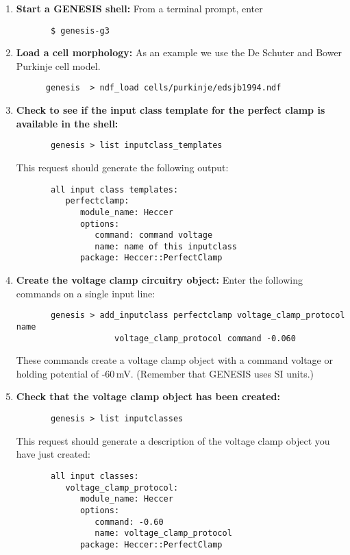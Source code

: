 \documentclass[12pt]{article}
\begin{document}
\begin{enumerate}

	\item{\bf Start a GENESIS shell:} From a terminal prompt, enter
	\begin{verbatim}
	   $ genesis-g3
	\end{verbatim}
	
	\item{\bf Load a cell morphology:} As an example we use the De Schuter and Bower Purkinje cell model.
	\begin{verbatim}
	  genesis  > ndf_load cells/purkinje/edsjb1994.ndf
	\end{verbatim}
	
	\item{\bf Check to see if the input class template for the perfect clamp is available in the shell:}
	\begin{verbatim}
	   genesis > list inputclass_templates
	\end{verbatim}
	This request should generate the following output:
	\begin{verbatim}
	   all input class templates: 
	      perfectclamp:
	         module_name: Heccer
	         options:
	            command: command voltage
	            name: name of this inputclass
	         package: Heccer::PerfectClamp
	\end{verbatim}
	
	\item{\bf Create the voltage clamp circuitry object:} Enter the following commands on a single input line:
	\begin{verbatim}
	   genesis > add_inputclass perfectclamp voltage_clamp_protocol name
	                voltage_clamp_protocol command -0.060
	\end{verbatim}
	These commands create a voltage clamp object with a command voltage or holding potential of -60\,mV. (Remember that GENESIS uses SI units.)
	
	\item{\bf Check that the voltage clamp object has been created:}
	\begin{verbatim}
	   genesis > list inputclasses
	\end{verbatim}
	This request should generate a description of the voltage clamp object you have just created:
	\begin{verbatim}
	   all input classes: 
	      voltage_clamp_protocol:
	         module_name: Heccer
	         options:
	            command: -0.60
	            name: voltage_clamp_protocol
	         package: Heccer::PerfectClamp
	\end{verbatim}
	

\end{enumerate}
\end{document}
